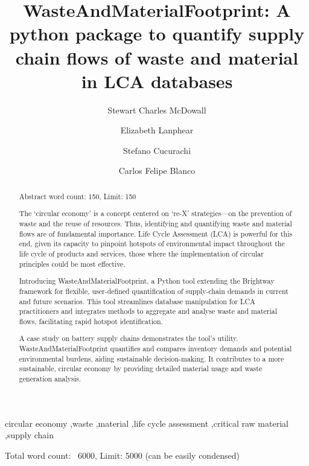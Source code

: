 \documentclass[final,5p,authoryear]{elsarticle}
\newcommand{\cbox}[1]{
    \begin{tcolorbox}[hbox, colback=red!5!white, colframe=red!65!black, boxrule=0.25pt, boxsep=2pt, left=2pt, right=2pt, top=1pt, bottom=1pt]
        \small\sffamily #1
    \end{tcolorbox}
}
\begin{document}
\begin{frontmatter}

    \title{WasteAndMaterialFootprint: A python package to quantify supply chain flows of waste and material in LCA databases}
    \author[1]{Stewart Charles McDowall}
    \author[1]{Elizabeth Lanphear}
    \author[1]{Stefano Cucurachi}
    \author[1]{Carlos Felipe Blanco}



    \begin{abstract}
        \cbox{Abstract word count: 150, Limit: 150}
        
        The `circular economy' is a concept centered on `re-X' strategies---on the prevention of waste and the reuse of resources. Thus, identifying and quantifying waste and material flows are of fundamental importance. Life Cycle Assessment (LCA) is powerful for this end, given its capacity to pinpoint hotspots of environmental impact throughout the life cycle of products and services, those where the implementation of circular principles could be most effective.

        Introducing WasteAndMaterialFootprint, a Python tool extending the Brightway framework for flexible, user-defined quantification of supply-chain demands in current and future scenarios. This tool streamlines database manipulation for LCA practitioners and integrates methods to aggregate and analyse waste and material flows, facilitating rapid hotspot identification.

        A case study on battery supply chains demonstrates the tool's utility. WasteAndMaterialFootprint quantifies and compares inventory demands and potential environmental burdens, aiding sustainable decision-making. It contributes to a more sustainable, circular economy by providing detailed material usage and waste generation analysis.

    \end{abstract}


    \begin{keyword}
        circular economy \sep waste \sep material \sep life cycle assessment \sep critical raw material \sep supply chain
    \end{keyword}

\end{frontmatter}
\cbox{Total word count: ~6000, Limit: 5000 (can be easily condensed)}
\end{document}

